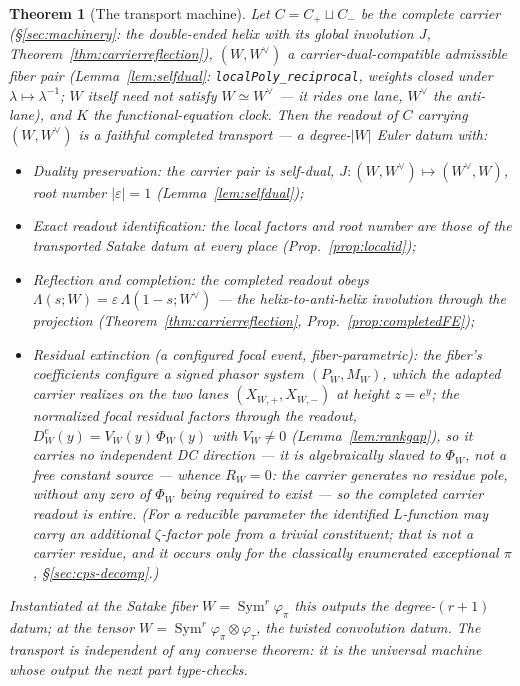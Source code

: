 \documentclass[11pt]{article}
\newtheorem{theorem}{Theorem}
\theoremstyle{definition}
\newcommand{\Sym}{\operatorname{Sym}}
\begin{document}
\begin{theorem}[The transport machine]\label{thm:transport}
Let $C=C_+\sqcup C_-$ be the complete carrier (\S\ref{sec:machinery}: the double-ended helix with its global
involution $J$, Theorem~\ref{thm:carrierreflection}), $(W,W^\vee)$ a \emph{carrier-dual-compatible} admissible
fiber pair (Lemma~\ref{lem:selfdual}: \texttt{localPoly\_reciprocal}, weights closed under
$\lambda\mapsto\lambda^{-1}$; $W$ itself need not satisfy $W\simeq W^\vee$ --- it rides one lane, $W^\vee$ the
anti-lane), and $K$ the functional-equation clock. Then the readout of $C$ carrying $(W,W^\vee)$ is a
\emph{faithful completed transport} --- a degree-$|W|$ Euler datum with:
\begin{itemize}
\item[\textup{(a)}] \emph{Duality preservation}: the carrier pair is self-dual, $J\colon(W,W^\vee)\mapsto
(W^\vee,W)$, root number $|\varepsilon|=1$ (Lemma~\ref{lem:selfdual});
\item[\textup{(b)}] \emph{Exact readout identification}: the local factors and root number are those of the
transported Satake datum at every place (Prop.~\ref{prop:localid});
\item[\textup{(c)}] \emph{Reflection and completion}: the completed readout obeys
$\Lambda(s;W)=\varepsilon\,\Lambda(1-s;W^\vee)$ --- the helix-to-anti-helix involution through the projection
(Theorem~\ref{thm:carrierreflection}, Prop.~\ref{prop:completedFE});
\item[\textup{(d)}] \emph{Residual extinction (a configured focal event, fiber-parametric)}: the fiber's
coefficients configure a signed phasor system $(P_W,M_W)$, which the adapted carrier realizes on the two lanes
$(X_{W,+},X_{W,-})$ at height $z=e^y$; the normalized focal residual factors through the readout,
$D^{\mathrm c}_W(y)=V_W(y)\,\Phi_W(y)$ with $V_W\neq0$ (Lemma~\ref{lem:rankgap}), so it carries \emph{no
independent} DC direction --- it is algebraically slaved to $\Phi_W$, not a free constant source --- whence
$R_W=0$: \emph{the carrier generates no residue pole}, without any zero of $\Phi_W$ being required to exist ---
so the completed carrier readout is entire. (For a reducible parameter the identified $L$-function may carry an
additional $\zeta$-factor pole from a trivial constituent; that is not a carrier residue, and it occurs only
for the classically enumerated exceptional $\pi$, \S\ref{sec:cps-decomp}.)
\end{itemize}
Instantiated at the Satake fiber $W=\Sym^r\varphi_\pi$ this outputs the degree-$(r+1)$ datum; at the tensor
$W=\Sym^r\varphi_\pi\otimes\varphi_\tau$, the twisted convolution datum. The transport is independent of any
converse theorem: it is the universal machine whose output the next part type-checks.
\end{theorem}
\end{document}
